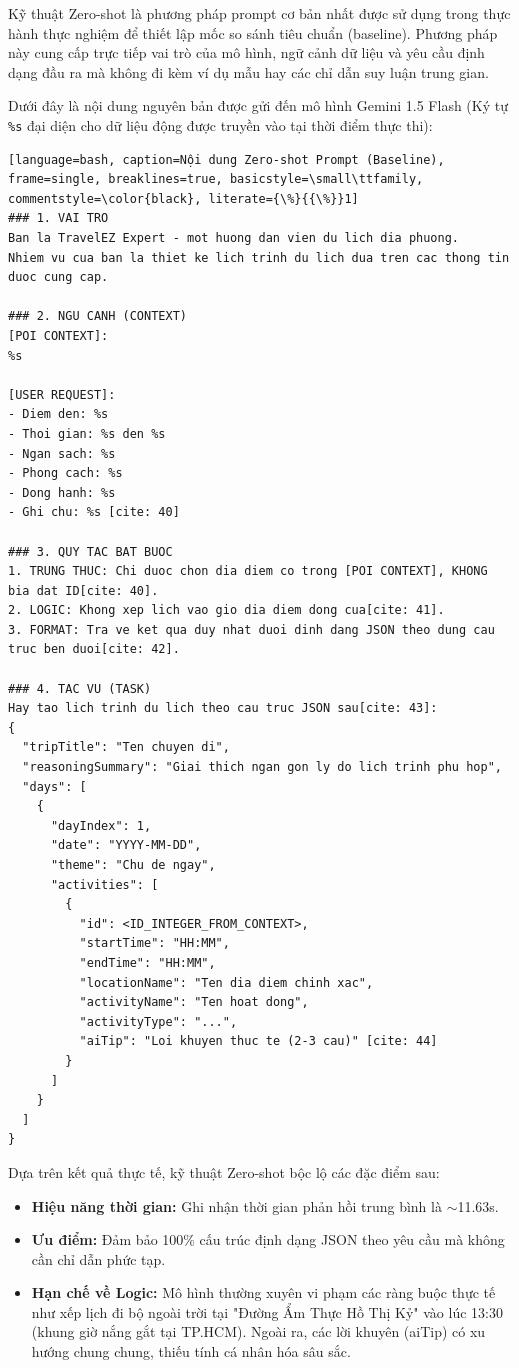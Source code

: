 \label{app:zero_shot_prompt}

Kỹ thuật Zero-shot là phương pháp prompt cơ bản nhất được sử dụng trong thực hành thực nghiệm để thiết lập mốc so sánh tiêu chuẩn (baseline). Phương pháp này cung cấp trực tiếp vai trò của mô hình, ngữ cảnh dữ liệu và yêu cầu định dạng đầu ra mà không đi kèm ví dụ mẫu hay các chỉ dẫn suy luận trung gian.

Dưới đây là nội dung nguyên bản được gửi đến mô hình Gemini 1.5 Flash (Ký tự \texttt{\%s} đại diện cho dữ liệu động được truyền vào tại thời điểm thực thi):

\begin{lstlisting}[language=bash, caption=Nội dung Zero-shot Prompt (Baseline), frame=single, breaklines=true, basicstyle=\small\ttfamily, commentstyle=\color{black}, literate={\%}{{\%}}1]
### 1. VAI TRO
Ban la TravelEZ Expert - mot huong dan vien du lich dia phuong. 
Nhiem vu cua ban la thiet ke lich trinh du lich dua tren cac thong tin duoc cung cap.

### 2. NGU CANH (CONTEXT)
[POI CONTEXT]:
%s

[USER REQUEST]:
- Diem den: %s
- Thoi gian: %s den %s
- Ngan sach: %s
- Phong cach: %s
- Dong hanh: %s
- Ghi chu: %s [cite: 40]

### 3. QUY TAC BAT BUOC
1. TRUNG THUC: Chi duoc chon dia diem co trong [POI CONTEXT], KHONG bia dat ID[cite: 40].
2. LOGIC: Khong xep lich vao gio dia diem dong cua[cite: 41].
3. FORMAT: Tra ve ket qua duy nhat duoi dinh dang JSON theo dung cau truc ben duoi[cite: 42].

### 4. TAC VU (TASK)
Hay tao lich trinh du lich theo cau truc JSON sau[cite: 43]:
{
  "tripTitle": "Ten chuyen di",
  "reasoningSummary": "Giai thich ngan gon ly do lich trinh phu hop",
  "days": [
    {
      "dayIndex": 1,
      "date": "YYYY-MM-DD",
      "theme": "Chu de ngay",
      "activities": [
        {
          "id": <ID_INTEGER_FROM_CONTEXT>,
          "startTime": "HH:MM",
          "endTime": "HH:MM",
          "locationName": "Ten dia diem chinh xac",
          "activityName": "Ten hoat dong",
          "activityType": "...",
          "aiTip": "Loi khuyen thuc te (2-3 cau)" [cite: 44]
        }
      ]
    }
  ]
}
\end{lstlisting}

Dựa trên kết quả thực tế, kỹ thuật Zero-shot bộc lộ các đặc điểm sau:
\begin{itemize}
    \item \textbf{Hiệu năng thời gian:} Ghi nhận thời gian phản hồi trung bình là $\sim$11.63s.
    \item \textbf{Ưu điểm:} Đảm bảo 100\% cấu trúc định dạng JSON theo yêu cầu mà không cần chỉ dẫn phức tạp.
    \item \textbf{Hạn chế về Logic:} Mô hình thường xuyên vi phạm các ràng buộc thực tế như xếp lịch đi bộ ngoài trời tại "Đường Ẩm Thực Hồ Thị Kỷ" vào lúc 13:30 (khung giờ nắng gắt tại TP.HCM). Ngoài ra, các lời khuyên (aiTip) có xu hướng chung chung, thiếu tính cá nhân hóa sâu sắc.
\end{itemize}